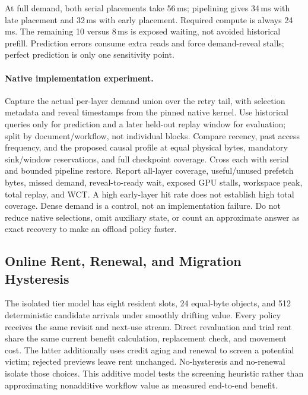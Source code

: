 \documentclass[sigplan,10pt,anonymous,nonacm]{acmart}
\begin{document}
At full demand, both serial placements take 56\,ms; pipelining gives
34\,ms with late placement and 32\,ms with early placement. Required
compute is always 24\,ms. The remaining 10 versus 8\,ms is exposed
waiting, not avoided historical prefill. Prediction errors consume
extra reads and force demand-reveal stalls; perfect prediction is only
one sensitivity point.

\paragraph{Native implementation experiment.}
Capture the actual per-layer demand union over the retry tail, with
selection metadata and reveal timestamps from the pinned native kernel.
Use historical queries only for prediction and a later held-out replay
window for evaluation; split by document/workflow, not individual blocks.
Compare recency, past access frequency, and the proposed causal profile
at equal physical bytes, mandatory sink/window reservations, and full
checkpoint coverage. Cross each with serial and bounded pipeline restore.
Report all-layer coverage, useful/unused prefetch bytes, missed demand,
reveal-to-ready wait, exposed GPU stalls, workspace peak, total replay,
and WCT. A high early-layer hit rate does not establish high total
coverage. Dense demand is a control, not an implementation failure.
Do not reduce native selections, omit auxiliary state, or count an
approximate answer as exact recovery to make an offload policy faster.

\FloatBarrier
\subsection{Online Rent, Renewal, and Migration Hysteresis}

The isolated tier model has eight resident slots, 24 equal-byte objects,
and 512 deterministic candidate arrivals under smoothly drifting value.
Every policy receives the same revisit and next-use stream. Direct
revaluation and trial rent share the same current benefit calculation,
replacement check, and movement cost. The latter additionally uses
credit aging and renewal to screen a potential victim; rejected previews
leave rent unchanged. No-hysteresis and no-renewal isolate those choices.
This additive model tests the screening heuristic rather than approximating
nonadditive workflow value as measured end-to-end benefit.
\end{document}
